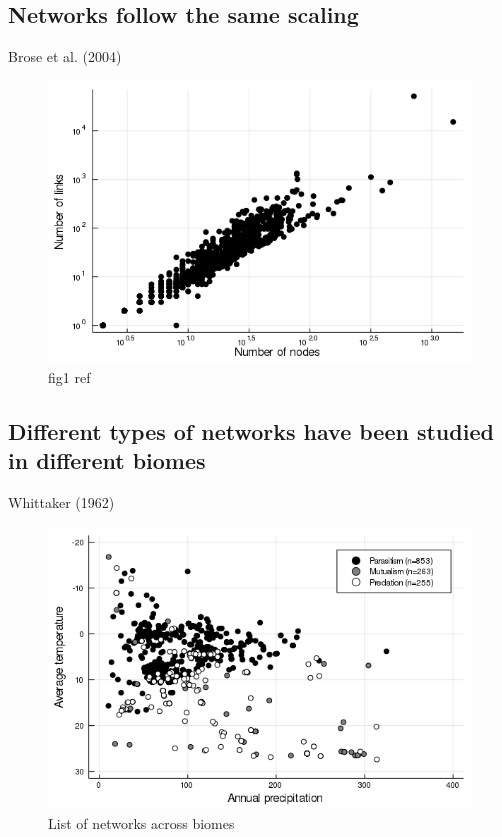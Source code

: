 \hypertarget{networks-follow-the-same-scaling}{%
\subsection{Networks follow the same
scaling}\label{networks-follow-the-same-scaling}}

Brose et al. (2004)

\begin{figure}
\centering
\includegraphics{figures/figure_01_b.png}
\caption{fig1 ref\label{fig:lssl}}
\end{figure}

\hypertarget{different-types-of-networks-have-been-studied-in-different-biomes}{%
\subsection{Different types of networks have been studied in different
biomes}\label{different-types-of-networks-have-been-studied-in-different-biomes}}

Whittaker (1962)

\begin{figure}
\centering
\includegraphics{figures/figure_02.png}
\caption{List of networks across biomes\label{fig:biomes}}
\end{figure}

